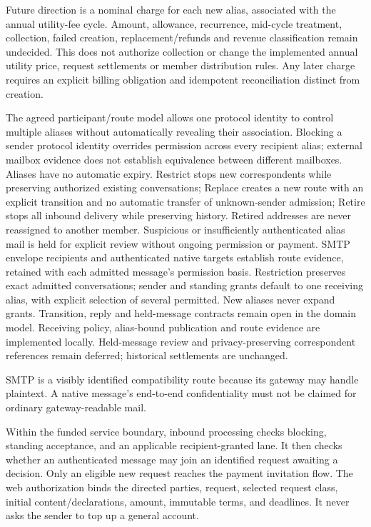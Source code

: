\documentclass[11pt]{article}
\begin{document}
Future direction is a nominal charge for each new alias, associated with the annual
utility-fee cycle. Amount, allowance, recurrence, mid-cycle treatment, collection,
failed creation, replacement/refunds and revenue classification remain undecided.
This does not authorize collection or change the implemented annual utility price,
request settlements or member distribution rules. Any later charge requires an
explicit billing obligation and idempotent reconciliation distinct from creation.


The agreed participant/route model allows one protocol identity to control
multiple aliases without automatically revealing their association. Blocking a
sender protocol identity overrides permission across every recipient alias;
external mailbox evidence does not establish equivalence between different
mailboxes. Aliases have no automatic expiry. Restrict stops new
correspondents while preserving authorized existing conversations; Replace creates
a new route with an explicit transition and no automatic transfer of unknown-sender
admission; Retire stops all inbound delivery while preserving history. Retired
addresses are never reassigned to another member. Suspicious or insufficiently
authenticated alias mail is held for explicit review without ongoing
permission or payment. SMTP envelope recipients and authenticated native targets
establish route evidence, retained with each admitted message's permission basis.
Restriction preserves exact admitted conversations; sender and standing grants
default to one receiving alias, with explicit selection of several permitted.
New aliases never expand grants. Transition, reply and held-message contracts
remain open in the domain model. Receiving policy, alias-bound publication and route evidence are implemented locally.
Held-message review and privacy-preserving correspondent references remain deferred;
historical settlements are unchanged.

SMTP is a visibly identified compatibility route because its gateway may handle
plaintext. A native message's end-to-end confidentiality must not be claimed for
ordinary gateway-readable mail.

Within the funded service boundary, inbound processing checks blocking, standing
acceptance, and an applicable recipient-granted lane. It then checks whether an authenticated message may join
an identified request awaiting a decision. Only an eligible new request reaches the payment
invitation flow. The web authorization binds the directed parties, request,
selected request class, initial content/declarations, amount, immutable terms, and deadlines. It never
asks the sender to top up a general account.
\end{document}
